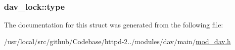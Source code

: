 \subsubsection[{\texorpdfstring{type}{type}}]{ dav\+\_\+lock\+::type}\hypertarget{structdav__lock_a4aa3e9701a82c81261524a82dc6e7416}{}\label{structdav__lock_a4aa3e9701a82c81261524a82dc6e7416}


The documentation for this struct was generated from the following file\+:\begin{DoxyCompactItemize}
\item 
/usr/local/src/github/\+Codebase/httpd-\/2../modules/dav/main/\hyperlink{mod__dav_8h}{mod\+\_\+dav.\+h}\end{DoxyCompactItemize}
